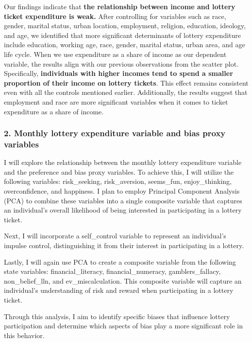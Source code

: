 \documentclass[
  12pt]{article}
\begin{document}
Our findings indicate that \textbf{the relationship between income and
lottery ticket expenditure is weak.} After controlling for variables
such as race, gender, marital status, urban location, employment,
religion, education, ideology, and age, we identified that more
significant determinants of lottery expenditure include education,
working age, race, gender, marital status, urban area, and age life
cycle. When we use expenditure as a share of income as our dependent
variable, the results align with our previous observations from the
scatter plot. Specifically, \textbf{individuals with higher incomes tend
to spend a smaller proportion of their income on lottery tickets}. This
effect remains consistent even with all the controls mentioned earlier.
Additionally, the results suggest that employment and race are more
significant variables when it comes to ticket expenditure as a share of
income.

\subsubsection{2. Monthly lottery expenditure variable and bias proxy
variables}\label{monthly-lottery-expenditure-variable-and-bias-proxy-variables}

I will explore the relationship between the monthly lottery expenditure
variable and the preference and bias proxy variables. To achieve this, I
will utilize the following variables: risk\_seeking, risk\_aversion,
seems\_fun, enjoy\_thinking, overconfidence, and happiness. I plan to
employ Principal Component Analysis (PCA) to combine these variables
into a single composite variable that captures an individual's overall
likelihood of being interested in participating in a lottery ticket.

Next, I will incorporate a self\_control variable to represent an
individual's impulse control, distinguishing it from their interest in
participating in a lottery.

Lastly, I will again use PCA to create a composite variable from the
following state variables: financial\_literacy, financial\_numeracy,
gamblers\_fallacy, non\_belief\_lln, and ev\_miscalculation. This
composite variable will capture an individual's understanding of risk
and reward when participating in a lottery ticket.

Through this analysis, I aim to identify specific biases that influence
lottery participation and determine which aspects of bias play a more
significant role in this behavior.
\end{document}
